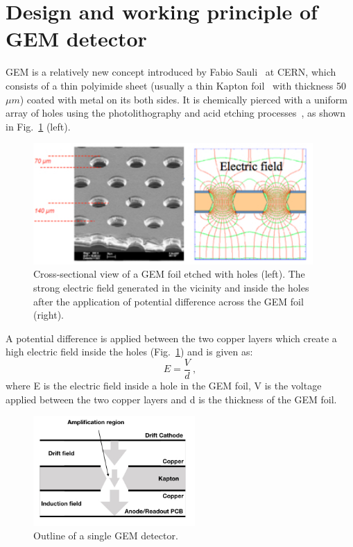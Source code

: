 \section{Design and working principle of GEM detector} %
\label{sec:design_and_working_principle_of_gem}
GEM is a relatively new concept introduced by Fabio Sauli~\cite{Sauli1997} at CERN, which consists of a thin polyimide sheet (usually a thin Kapton foil~\cite{Kapton-sheet} with thickness 50 $\mu m$) coated with metal on its both sides.
It is chemically pierced with a uniform array of holes using the photolithography and acid etching processes~\cite{Benlloch1998}, as shown in Fig.~\ref{fig:gem} (left).
\begin{figure}[!htbp]
    \centering
    \includegraphics[width=0.95\textwidth]{figures/GEM/KEKDTP3.jpg}
    \caption{Cross-sectional view of a GEM foil etched with holes (left). The strong electric field generated in the vicinity and inside the holes after the application of potential difference across the GEM foil (right).}
    \label{fig:gem}
\end{figure}

A potential difference is applied between the two copper layers which create a high electric field inside the holes (Fig.~\ref{fig:gem}) and is given as:
\begin{equation}
    E = \frac{V}{d}~,
\end{equation}
where E is the electric field inside a hole in the GEM foil, V is the voltage applied between the two copper layers and d is the thickness of the GEM foil.
\begin{figure}[htbp]
    \centering
    \includegraphics[width=0.55\textwidth]{figures/GEM/SingleGEM_Detector.jpeg}
    \caption{Outline of a single GEM detector.}
    \label{fig:gemOutline}
\end{figure}

